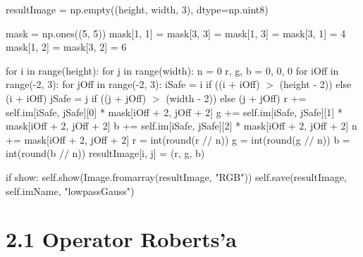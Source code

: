 \documentclass[final,a4paper,openany,12pt]{mwbk}
\begin{document}
resultImage = np.empty((height, width, 3), dtype=np.uint8) \newline

mask = np.ones((5, 5)) \newline
\indent mask[1, 1] = mask[3, 3] = mask[1, 3] = mask[3, 1] = 4 \newline
\indent mask[1, 2] = mask[3, 2] = 6 \newline

for i in range(height): \newline
\indent for j in range(width): \newline
\indent n = 0 \newline
\indent r, g, b = 0, 0, 0 \newline
\indent for iOff in range(-2, 3): \newline
\indent for jOff in range(-2, 3): \newline
\indent iSafe = i if ((i + iOff) $>$ (height - 2)) else (i + iOff) \newline
\indent jSafe = j if ((j + jOff) $>$ (width - 2)) else (j + jOff) \newline
\indent r += self.im[iSafe, jSafe][0] * mask[iOff + 2, jOff + 2] \newline
\indent g += self.im[iSafe, jSafe][1] * mask[iOff + 2, jOff + 2] \newline
\indent b += self.im[iSafe, jSafe][2] * mask[iOff + 2, jOff + 2] \newline
\indent n += mask[iOff + 2, jOff + 2] \newline
\indent r = int(round(r $//$ n)) \newline
\indent g = int(round(g $//$ n)) \newline
\indent b = int(round(b $//$ n)) \newline
\indent resultImage[i, j] = (r, g, b) \newline

if show: \newline
\indent self.show(Image.fromarray(resultImage, "RGB")) \newline
\indent self.save(resultImage, self.imName, "lowpassGauss") \newline
\newpage



\section*{2.1 Operator Roberts'a}
\end{document}
